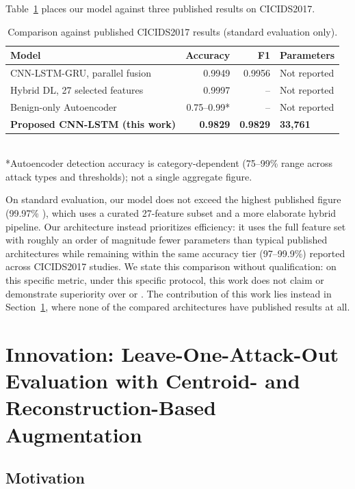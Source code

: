 \documentclass[11pt]{article}
\begin{document}
Table~\ref{tab:sota} places our model against three published results on CICIDS2017.

\begin{table}[h]
\centering
\caption{Comparison against published CICIDS2017 results (standard evaluation only).}
\label{tab:sota}
\small
\begin{tabular}{lrrl}
\toprule
Model & Accuracy & F1 & Parameters \\
\midrule
CNN-LSTM-GRU, parallel fusion \cite{afraji2025} & 0.9949 & 0.9956 & Not reported \\
Hybrid DL, 27 selected features \cite{kumar2023} & 0.9997 & -- & Not reported \\
Benign-only Autoencoder \cite{hindy2020} & 0.75--0.99* & -- & Not reported \\
\textbf{Proposed CNN-LSTM (this work)} & \textbf{0.9829} & \textbf{0.9829} & \textbf{33{,}761} \\
\bottomrule
\end{tabular}
\\[2pt]
\footnotesize{*Autoencoder detection accuracy is category-dependent (75--99\% range across attack
types and thresholds); not a single aggregate figure.}
\end{table}

On standard evaluation, our model does not exceed the highest published figure (99.97\%
\cite{kumar2023}), which uses a curated 27-feature subset and a more elaborate hybrid pipeline. Our
architecture instead prioritizes efficiency: it uses the full feature set with roughly an order of
magnitude fewer parameters than typical published architectures while remaining within the same
accuracy tier (97--99.9\%) reported across CICIDS2017 studies. We state this comparison without
qualification: on this specific metric, under this specific protocol, this work does not claim or
demonstrate superiority over \cite{afraji2025} or \cite{kumar2023}. The contribution of this work
lies instead in Section~\ref{sec:loao}, where none of the compared architectures have published
results at all.

\section{Innovation: Leave-One-Attack-Out Evaluation with Centroid- and Reconstruction-Based Augmentation}
\label{sec:loao}

\subsection{Motivation}
\end{document}
